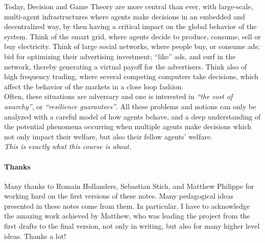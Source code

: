 Today, Decision and Game Theory are more central than ever, with large-scale, multi-agent infrastructures where agents make decisions in an embedded and decentralized way, by then having a critical impact on the global behavior of the system.  Think of the smart grid, where agents decide to produce, consume, sell or buy electricity.  Think of large social networks, where people buy, or consume ads; bid for optimizing their advertising investment; ``like'' ads, and surf in the network, thereby generating a virtual payoff for the advertisers.  Think also of high frequency trading, where several competing computers take decisions, which affect the behavior of the markets in a close loop fashion.\\   Often, these situations are adversary and one is interested in \emph{``the cost of anarchy''}, or \emph{``resilience guarantees''}.  All these problems and notions can only be analyzed with a careful model of how agents behave, and a deep understanding of the potential phenomena occurring when multiple agents make decisions which not only impact their welfare, but also their fellow agents' welfare.  \\
\emph{This is exactly what this course is about.}


\paragraph{Thanks}
Many thanks to Romain Hollanders, Sebastian Stich, and Matthew Philippe for working hard on the first versions of these notes. Many pedagogical ideas presented in these notes come from them.  In particular, I have to acknowledge the amazing work achieved by Matthew, who was leading the project from the first drafts to the final version, not only in writing, but also for many higher level ideas.  Thanks a lot!

\label{chap:intro}




\ifx \globalmark \undefined %


	
\else 
	
\fi




